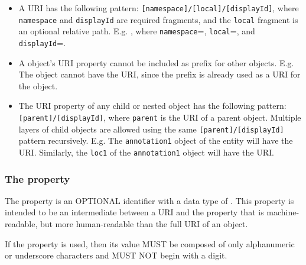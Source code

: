 \begin{itemize}
 
 \item A  URI has the following pattern:
  \texttt{[namespace]/[local]/[displayId]},  where \texttt{namespace} and \texttt{displayId} are required fragments, and the \texttt{local} fragment is an optional relative path. E.g. , where \texttt{namespace}=, \texttt{local}=, and \texttt{displayId}=.
 
  \item A  object's URI property cannot be included as prefix for other  objects. E.g. The   object cannot have the  URI, since the  prefix is already used as a URI for the   object.
  \item The URI property of any child or nested object has the following pattern:\texttt{[parent]/[displayId]}, where \texttt{parent} is the URI of a parent object. Multiple layers of child objects are allowed using the same \texttt{[parent]/[displayId]} pattern recursively. E.g. The \texttt{annotation1}  object of the   entity will have the  URI. Similarly, the \texttt{loc1}  of the \texttt{annotation1}  object will have the  URI.
  \end{itemize}
  
\subsubsection*{The  property}
\label{sec:displayId}
The  property is an OPTIONAL identifier with a data type of . This property is intended to be an intermediate between a URI and the  property that is machine-readable, but more human-readable than the full URI of an object.

If the  property is used, then its  value MUST be composed of only alphanumeric or underscore characters and MUST NOT begin with a digit.

